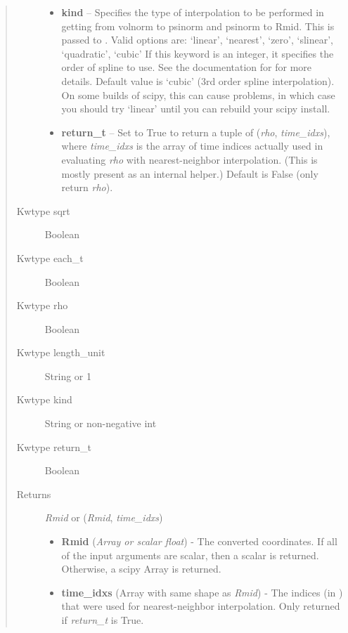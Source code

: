 \documentclass[letterpaper,10pt,english]{sphinxmanual}
\begin{document}
\begin{fulllineitems}
\begin{fulllineitems}
\begin{quote}
\begin{description}
\begin{itemize}
\item {} 
\textbf{kind} -- Specifies the type of
interpolation to be performed in getting from volnorm to
psinorm and psinorm to Rmid. This is passed to
. Valid options are:
`linear', `nearest', `zero', `slinear', `quadratic', `cubic'
If this keyword is an integer, it specifies the order of spline
to use. See the documentation for  for more
details. Default value is `cubic' (3rd order spline
interpolation). On some builds of scipy, this can cause problems,
in which case you should try `linear' until you can rebuild your
scipy install.

\item {} 
\textbf{return\_t} -- Set to True to return a tuple of (\emph{rho},
\emph{time\_idxs}), where \emph{time\_idxs} is the array of time indices
actually used in evaluating \emph{rho} with nearest-neighbor
interpolation. (This is mostly present as an internal helper.)
Default is False (only return \emph{rho}).

\end{itemize}

\item[{Kwtype sqrt}] \leavevmode
Boolean

\item[{Kwtype each\_t}] \leavevmode
Boolean

\item[{Kwtype rho}] \leavevmode
Boolean

\item[{Kwtype length\_unit}] \leavevmode
String or 1

\item[{Kwtype kind}] \leavevmode
String or non-negative int

\item[{Kwtype return\_t}] \leavevmode
Boolean

\item[{Returns}] \leavevmode

\emph{Rmid} or (\emph{Rmid}, \emph{time\_idxs})
\begin{itemize}
\item {} 
\textbf{Rmid} (\emph{Array or scalar float}) - The converted coordinates. If
all of the input arguments are scalar, then a scalar is returned.
Otherwise, a scipy Array is returned.

\item {} 
\textbf{time\_idxs} (Array with same shape as \emph{Rmid}) - The indices
(in ) that were used for
nearest-neighbor interpolation. Only returned if \emph{return\_t} is
True.


\end{itemize}
\end{description}
\end{quote}
\end{fulllineitems}
\end{fulllineitems}
\end{document}
